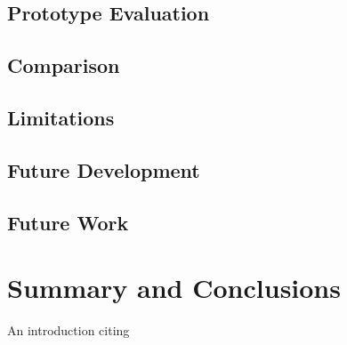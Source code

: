 \documentclass[a4paper]{article}
\begin{document}
\subsection{Prototype Evaluation}
\subsection{Comparison}
\subsection{Limitations}
\subsection{Future Development}
\subsection{Future Work}
\newpage

\section{Summary and Conclusions}
An introduction citing \cite{Liviosgier}

\newpage



\end{document}
